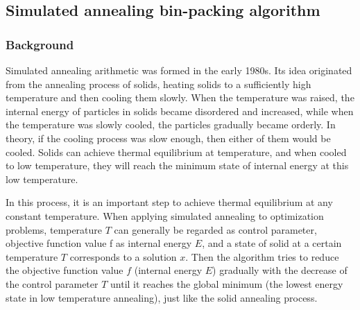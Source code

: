 \documentclass{mcmthesis}
\begin{document}
\subsection{Simulated annealing bin-packing algorithm}
\subsubsection{Background}
Simulated annealing arithmetic was formed in the early 1980s. Its idea originated from the annealing process of solids, heating solids to a sufficiently high temperature and then cooling them slowly. When the temperature was raised, the internal energy of particles in solids became disordered and increased, while when the temperature was slowly cooled, the particles gradually became orderly. In theory, if the cooling process was slow enough, then either of them would be cooled. Solids can achieve thermal equilibrium at temperature, and when cooled to low temperature, they will reach the minimum state of internal energy at this low temperature.      

\noindent In this process, it is an important step to achieve thermal equilibrium at any constant temperature. When applying simulated annealing to optimization problems, temperature $T$ can generally be regarded as control parameter, objective function value f as internal energy $E$, and a state of solid at a certain temperature $T$ corresponds to a solution $x$. Then the algorithm tries to reduce the objective function value $f$ (internal energy $E$) gradually with the decrease of the control parameter $T$ until it reaches the global minimum (the lowest energy state in low temperature annealing), just like the solid annealing process.
\end{document}
